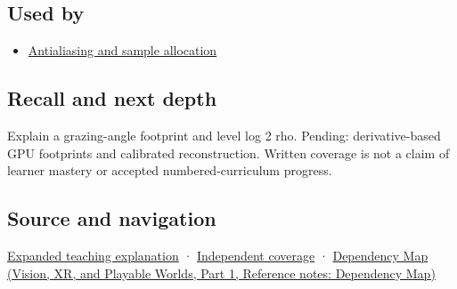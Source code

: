 \subsection{Used by}\label{appendix-b677a85ba76f-used-by}

\hypertarget{appendix-b677a85ba76f-used-by}{}

\begin{itemize}
\tightlist
\item
  \hyperref[appendix-4192b2bdd21e]{Antialiasing and sample allocation}
\end{itemize}

\subsection{Recall and next depth}\label{appendix-b677a85ba76f-recall-and-next-depth}

\hypertarget{appendix-b677a85ba76f-recall-and-next-depth}{}

Explain a grazing-angle footprint and level log 2 rho. Pending: derivative-based GPU footprints and calibrated reconstruction. Written coverage is not a claim of learner mastery or accepted numbered-curriculum progress.

\subsection{Source and navigation}\label{appendix-b677a85ba76f-source-and-navigation}

\hypertarget{appendix-b677a85ba76f-source-and-navigation}{}

\hyperref[04-visual-computing-ii-ch042-multiresolution-work-must-preserve-the-right-information]{Expanded teaching explanation} · \hyperref[appendix-fd090d982a15-xr01---independent-seeing-and-representation-source]{Independent coverage} · \href{../07-Vision-XR-and-Playable-Worlds-P01/main.pdf\#nameddest=appendix-4ad47bdd269a}{Dependency Map (Vision, XR, and Playable Worlds, Part 1, Reference notes: Dependency Map)}
